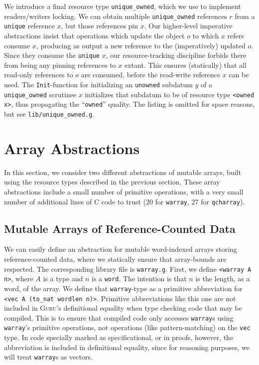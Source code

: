 \documentclass[9pt,natbib]{sigplanconf}
\begin{document}
We introduce a final resource type \texttt{unique\_owned}, which we
use to implement readers/writers locking.  We can obtain multiple
\texttt{unique\_owned} references $r$ from a \texttt{unique} reference
$x$, but those references pin $x$.  Our higher-level imperative
abstractions insist that operations which update the object $o$ to
which $x$ refers consume $x$, producing as output a new reference to
the (imperatively) updated $o$.  Since they consume the
\texttt{unique} $x$, our resource-tracking discipline forbids there
from being any pinning references to $x$ extant.  This ensures
(statically) that all read-only references to $o$ are consumed, before
the read-write reference $x$ can be used.  The \texttt{Init}-function
for initializing an \texttt{unowned} subdatum $y$ of a
\texttt{unique\_owned} scrutinee $x$ initializes that subdatum to be
of resource type \texttt{<owned x>}, thus propagating the
``\texttt{owned}'' quality.  The listing is omitted for space
reasons, but see \texttt{lib/unique\_owned.g}.

\section{Array Abstractions}

In this section, we consider two different abstractions of mutable
arrays, built using the resource types described in the previous
section.  These array abstractions include a small number of primitive
operations, with a very small number of additional lines of C code to
trust (20 for \texttt{warray}, 27 for \texttt{qcharray}).  

\subsection{Mutable Arrays of Reference-Counted Data}
\label{sec:arrays}

We can easily define an abstraction for mutable word-indexed arrays
storing reference-counted data, where we statically ensure that
array-bounds are respected.  The corresponding library file is
\texttt{warray.g}.  First, we define \texttt{<warray A n>}, where $A$
is a type and $n$ is a \texttt{word}.  The intention is that $n$ is
the length, as a word, of the array.  We define that
\texttt{warray}-type as a primitive abbreviation for \texttt{<vec A
  (to\_nat wordlen n)>}.  Primitive abbreviations like this one are
not included in \textsc{Guru}'s definitional equality when type
checking code that may be compiled.  This is to ensure that compiled
code only accesses \texttt{warray}s using \texttt{warray}'s primitive
operations, not operations (like pattern-matching) on the \texttt{vec}
type.  In code specially marked as specificational, or in proofs,
however, the abbreviation is included in definitional equality, since
for reasoning purposes, we will treat \texttt{warray}s as vectors.
\end{document}

